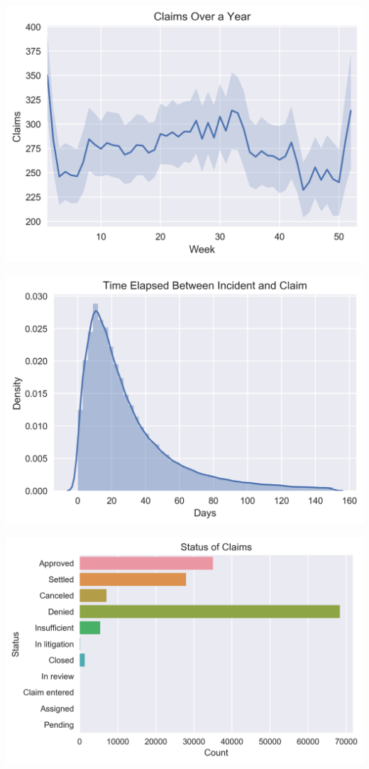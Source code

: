 \documentclass{beamer}
\begin{document}
\begin{frame}
	\includegraphics[keepaspectratio, width = \textwidth, height = \textheight]{../plots/avg_year}
\end{frame}

\begin{frame}
	\includegraphics[keepaspectratio, width = \textwidth, height = \textheight]{../plots/wait_time}
\end{frame}

\begin{frame}
	\includegraphics[keepaspectratio, width = \textwidth, height = \textheight]{../plots/status}
\end{frame}
\end{document}
